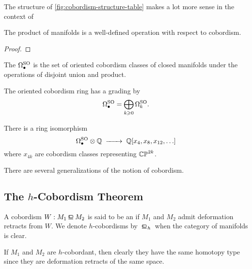 The structure of \cref{fig:cobordism-structure-table} makes a lot more sense in the context of 

\begin{proposition}
	The product of manifolds is a well-defined operation with respect to cobordism.
\end{proposition}
\begin{proof}
\end{proof}

\begin{definition}
	The  $\Omega^{\operatorname{SO}}_\bullet$ is the set of oriented cobordism classes of closed manifolds under the operations of disjoint union and product.
\end{definition}

The oriented cobordism ring has a grading by
\[
	\Omega_\bullet^{\operatorname{SO}} = \bigoplus_{k\geqslant 0} \Omega^{\operatorname{SO}}_k.
\]

\begin{theorem}\label{thm:oriented-cobordism-structure}
	There is a ring isomorphism
	\[
		\Omega_\bullet^\SO \otimes \Q \lkxto \Q[x_4, x_8, x_{12}, \ldots]
	\]
	where $x_{4k}$ are cobordism classes representing $\mathbb{CP}^{2k}$.
\end{theorem}



\begin{remark}
	There are several generalizations of the notion of cobordism.
\end{remark}


\subsection{The $h$-Cobordism Theorem}

\begin{definition}
	A cobordism $W : M_1\bord M_2$ is said to be an  if $M_1$ and $M_2$ admit deformation retracts from $W$. We denote $h$-cobordisms by $\hbord$ when the category of manifolds is clear.
\end{definition}

If $M_1$ and $M_2$ are $h$-cobordant, then clearly they have the same homotopy type since they are deformation retracts of the same space.

